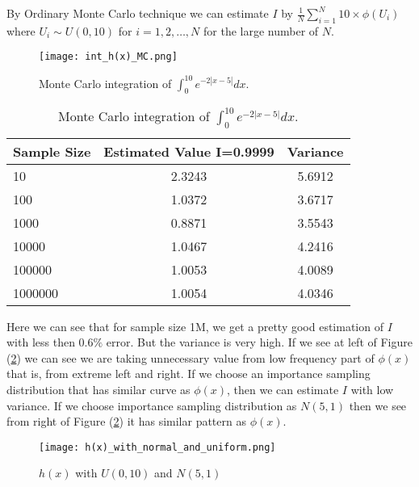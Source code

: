 \begin{example}
	By Ordinary Monte Carlo technique we can estimate $I$ by $\frac{1}{N}\sum_{i = 1}^{N} 10 \times \phi(U_i)$ where $U_i\sim U(0,10)$ for $i=1,2,\ldots,N$
	for the large number of $N$.
	\begin{figure}[H]
		\centering
		\texttt{[image: int\_h(x)\_MC.png]}
		\caption{Monte Carlo integration of $\int_{0}^{10} e^{-2 |x-5|} dx$.}
		\label{MC:IntegrationOFe-2|x*5|}
	\end{figure}
	\begin{table}[h]
		\centering
		\begin{tabular}{lcc}
			\hline
			Sample Size & Estimated Value I=0.9999 & Variance \\
			\hline
			10          & 2.3243                   & 5.6912   \\
			100         & 1.0372                   & 3.6717   \\
			1000        & 0.8871                   & 3.5543   \\
			10000       & 1.0467                   & 4.2416   \\
			100000      & 1.0053                   & 4.0089   \\
			1000000     & 1.0054                   & 4.0346   \\
			\hline
		\end{tabular}
		\caption{Monte Carlo integration of $\int_{0}^{10} e^{-2 |x-5|} dx$.}
		\label{tab:IntegrationOFe-2|x*5|}
	\end{table}
	Here we can see that for sample size 1M, we get a pretty good estimation of $I$ with less then $0.6\%$ error. But the variance is very high.
	If we see at left of Figure (\ref{fig:hxwithU01andN01}) we can see we are taking unnecessary value from low frequency part of $\phi(x)$ that is,
	from extreme left and right. If we choose an importance sampling distribution that has similar curve as $\phi(x)$, then we can estimate $I$ with low variance.
	If we choose importance sampling distribution as $N(5,1)$ then we see from right of Figure (\ref{fig:hxwithU01andN01}) it has similar pattern as $\phi(x)$.
	\begin{figure}[H]
		\centering
		\texttt{[image: h(x)\_with\_normal\_and\_uniform.png]}
		\caption{$h(x)$ with $U(0,10)$ and $N(5,1)$}
		\label{fig:hxwithU01andN01}
	\end{figure}


\end{example}
